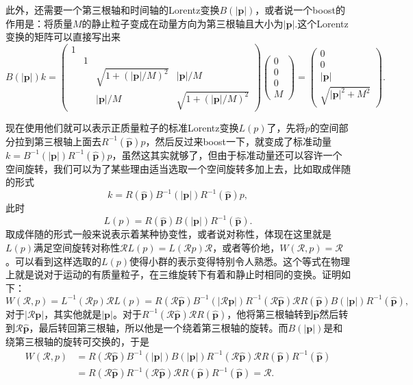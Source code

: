 \documentclass[9pt]{extbook}
\begin{document}
此外，还需要一个第三根轴和时间轴的Lorentz变换$B(|\bm{p}|)$，或者说一个boost的作用是：将质量$M$的静止粒子变成在动量方向为第三根轴且大小为$|\bm{p}|$.这个Lorentz变换的矩阵可以直接写出来
\[
	B(|\bm{p}|)k=
	\begin{pmatrix}
		1&&&\\
		&1&&\\
		&&\sqrt{1+(|\bm{p}|/M)^2}&|\bm{p}|/M\\
		&&|\bm{p}|/M&\sqrt{1+(|\bm{p}|/M)^2}
	 \end{pmatrix}
	 \begin{pmatrix}
		0\\
		0\\
		0\\
		M
	 \end{pmatrix}
	 =
	  \begin{pmatrix}
		0\\
		0\\
		|\bm{p}|\\
		\sqrt{|\bm{p}|^2+M^2}
	 \end{pmatrix}.
\]

现在使用他们就可以表示正质量粒子的标准Lorentz变换$L(p)$了，先将$p$的空间部分拉到第三根轴上面去$R^{-1}(\hat{\bm{p}})p$，然后反过来boost一下，就变成了标准动量$k=B^{-1}(|\bm{p}|)R^{-1}(\hat{\bm{p}})p$，虽然这其实就够了，但由于标准动量还可以容许一个空间旋转，我们可以为了某些理由适当选取一个空间旋转多加上去，比如取成伴随的形式
\[k=R(\hat{\bm{p}})B^{-1}(|\bm{p}|)R^{-1}(\hat{\bm{p}})p,\]此时
\[
L(p)=R(\hat{\bm{p}})B(|\bm{p}|)R^{-1}(\hat{\bm{p}}).
\]
取成伴随的形式一般来说表示着某种协变性，或者说对称性，体现在这里就是$L(p)$满足空间旋转对称性$\mathscr{R}L(p)=L(\mathscr{R}p)\mathscr{R}$，或者等价地，$W(\mathscr{R},p)=\mathscr{R}$。可以看到这样选取的$L(p)$使得小群的表示变得特别令人熟悉。这个等式在物理上就是说对于运动的有质量粒子，在三维旋转下有着和静止时相同的变换。证明如下：
\[
W(\mathscr{R},p)=L^{-1}(\mathscr{R}p)\mathscr{R}L(p)=R(\mathscr{R}\hat{\bm{p}})B^{-1}(|\mathscr{R}\bm{p}|)R^{-1}(\mathscr{R}\hat{\bm{p}})\mathscr{R}R(\hat{\bm{p}})B(|\bm{p}|)R^{-1}(\hat{\bm{p}}),
\]
对于$|\mathscr{R}\bm{p}|$，其实他就是$|\bm{p}|$。对于$R^{-1}(\mathscr{R}\hat{\bm{p}})\mathscr{R}R(\hat{\bm{p}})$，他将第三根轴转到$\hat{\bm{p}}$然后转到$\mathscr{R}\hat{\bm{p}}$，最后转回第三根轴，所以他是一个绕着第三根轴的旋转。而$B(|\bm{p}|)$是和绕第三根轴的旋转可交换的，于是
\[
\begin{split}
W(\mathscr{R},p)&=R(\mathscr{R}\hat{\bm{p}})B^{-1}(|\bm{p}|)B(|\bm{p}|)R^{-1}(\mathscr{R}\hat{\bm{p}})\mathscr{R}R(\hat{\bm{p}})R^{-1}(\hat{\bm{p}})\\
&=R(\mathscr{R}\hat{\bm{p}})R^{-1}(\mathscr{R}\hat{\bm{p}})\mathscr{R}R(\hat{\bm{p}})R^{-1}(\hat{\bm{p}})=\mathscr{R}.
\end{split}
\]
\end{document}
